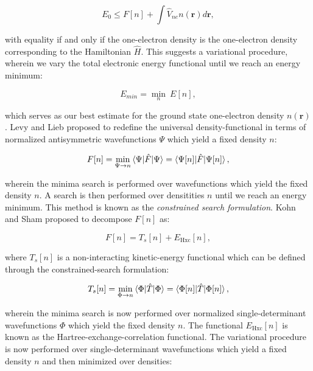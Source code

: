 \begin{equation}
 E_0 \leq F[n] + \int \hat{V}_{ne} n(\bm{r}) d\bm{r} , 
\end{equation}

with equality if and only if the one-electron density
is the one-electron density corresponding to the Hamiltonian $\hat{H}$.
This suggests a variational procedure, wherein
we vary the total electronic energy functional
until we reach an energy minimum:

\begin{equation}
 E_{min} = \underset{n}{\min} \ E[n] , 
\end{equation}

which serves as our best estimate for the ground state
one-electron density $n(\bm{r})$.
Levy and Lieb \cite{levy1979universal, perdew1982density, perdew1983physical}
proposed to redefine the universal density-functional
in terms of normalized antisymmetric wavefunctions $\Psi$
which yield a fixed density $n$:

\begin{equation}
 F[n] = \underset{\Psi \rightarrow n}{\min}
    \braket{\Psi | \hat{F} | \Psi}
    = \braket{\Psi[n] | \hat{F} | \Psi[n]} , 
\end{equation}

wherein the minima search is performed over wavefunctions
which yield the fixed density $n$.
A search is then performed over densitities $n$
until we reach an energy minimum. This method
is known as the \textit{constrained search formulation}.
Kohn and Sham proposed to decompose $F[n]$ as:

\begin{equation}
 F[n] = T_s[n] + E_{\text{Hxc}}[n] , 
\end{equation}

where $T_s[n]$ is a non-interacting kinetic-energy functional
which can be defined through the constrained-search formulation:

\begin{equation}
 T_s[n] = \underset{\Phi \rightarrow n}{\min}
    \braket{\Phi | \hat{T} | \Phi}
    = \braket{\Phi[n] | \hat{T} | \Phi[n]} , 
\end{equation}

wherein the minima search is now performed over normalized
single-determinant wavefunctions $\Phi$ which yield
the fixed density $n$. The functional
$E_{\text{Hxc}}[n]$ is known as the Hartree-exchange-correlation
functional. The variational procedure is now
performed over single-determinant wavefunctions
which yield a fixed density $n$ and then
minimized over densities:

